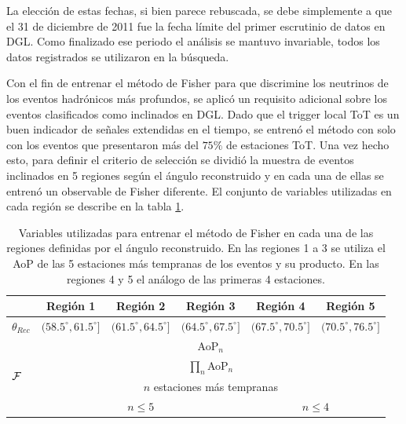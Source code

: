 	La elección de estas fechas, si bien parece rebuscada, se debe simplemente a que el 31 de diciembre de 2011 fue la fecha l\'imite del primer escrutinio de datos en DGL.
	Como finalizado ese periodo el análisis se mantuvo invariable, todos los datos registrados se utilizaron en la búsqueda.
	
	Con el fin de entrenar el método de Fisher para que discrimine los neutrinos de los eventos hadr\'onicos más profundos, se aplicó un requisito adicional sobre los eventos clasificados como inclinados en DGL.
	Dado que el trigger local ToT es un buen indicador de señales extendidas en el tiempo, se entrenó el método con solo con los eventos que presentaron más del $75\%$ de estaciones ToT.
	Una vez hecho esto, para definir el criterio de selección se dividió la muestra de eventos inclinados en 5 regiones según el ángulo reconstruido y en cada una de ellas se entrenó un observable de Fisher diferente.
	El conjunto de variables utilizadas en cada región se describe en la tabla \ref{tab:fisherDGL}. 
	\begin{table}[h!]
		\begin{center}
		\renewcommand{\arraystretch}{1.4}
		\footnotesize
			\begin{tabular}{|l|c|c|c|c|c|}
			\hline
			& Región 1 & Región 2 & Región 3 & Región 4 & Región 5 \\
			\hline
			$\theta_{Rec}$ & $(58.5^\circ,61.5^\circ]$ & $(61.5^\circ,64.5^\circ]$ &$(64.5^\circ,67.5^\circ]$ &$(67.5^\circ,70.5^\circ]$ & $(70.5^\circ,76.5^\circ]$ \\
			\hline
			\multirow{4}{*}{$\cal{F}$}  & \multicolumn{5}{c|}{AoP$_n$} \\
			                 & \multicolumn{5}{c|}{$\prod_n$AoP$_n$} \\
			                 & \multicolumn{5}{c|}{$n$ estaciones más tempranas} \\
			                 & \multicolumn{3}{c|}{$n\leq5$} & \multicolumn{2}{c|}{$n\leq4$} \\
			\hline
			\end{tabular}
			\caption{\label{tab:fisherDGL}
			Variables utilizadas para entrenar el método de Fisher en cada una de las regiones definidas por el ángulo reconstruido. En las regiones 1 a 3 se utiliza el AoP de las 5 estaciones más tempranas de los eventos y su producto. En las regiones 4 y 5 el análogo de las primeras 4 estaciones.}
		\end{center}	 
	\end{table}
	
